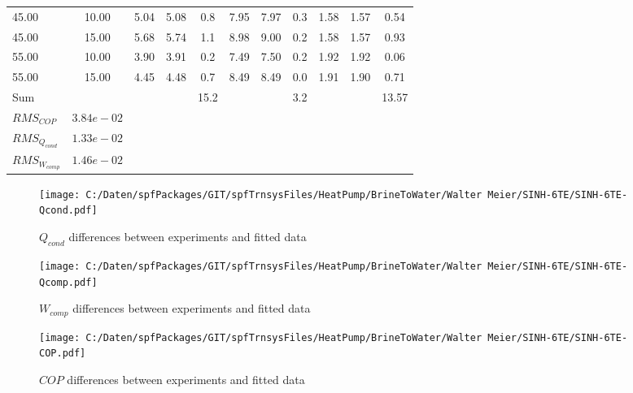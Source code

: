\documentclass[english]{SPFShortReport}
\begin{document}
\begin{table}[!ht]
\begin{small}
\begin{center}
{\begin{tabular}{l | c c c c c c c c c c }
45.00  & 10.00 & 5.04 & 5.08 & 0.8 & 7.95 & 7.97 & 0.3 & 1.58 & 1.57 & 0.54\\ 
45.00  & 15.00 & 5.68 & 5.74 & 1.1 & 8.98 & 9.00 & 0.2 & 1.58 & 1.57 & 0.93\\ 
55.00  & 10.00 & 3.90 & 3.91 & 0.2 & 7.49 & 7.50 & 0.2 & 1.92 & 1.92 & 0.06\\ 
55.00  & 15.00 & 4.45 & 4.48 & 0.7 & 8.49 & 8.49 & 0.0 & 1.91 & 1.90 & 0.71\\ 
\hline 
 Sum &  & &  & 15.2 &  &  & 3.2 & &  & 13.57\\ 
\hline 
 $RMS_{COP}$ & $3.84e-02$ \\ 
 $RMS_{Q_{cond}}$ & $1.33e-02$ \\ 
 $RMS_{W_{comp}}$ & $1.46e-02$ \\ 
\hline
\hline
\end{tabular}
}
\label{ErrorsTable}
\end{center}
\end{small}
\end{table}
\begin{figure}[!ht]
\begin{center}
\texttt{[image: C:/Daten/spfPackages/GIT/spfTrnsysFiles/HeatPump/BrineToWater/Walter Meier/SINH-6TE/SINH-6TE-Qcond.pdf]}
\caption{$Q_{cond}$ differences between experiments and fitted data}
\label{QcongFig}
\end{center}
\end{figure}
\begin{figure}[!ht]
\begin{center}
\texttt{[image: C:/Daten/spfPackages/GIT/spfTrnsysFiles/HeatPump/BrineToWater/Walter Meier/SINH-6TE/SINH-6TE-Qcomp.pdf]}
\caption{$W_{comp}$ differences between experiments and fitted data}
\label{QcompFig}
\end{center}
\end{figure}
\begin{figure}[!ht]
\begin{center}
\texttt{[image: C:/Daten/spfPackages/GIT/spfTrnsysFiles/HeatPump/BrineToWater/Walter Meier/SINH-6TE/SINH-6TE-COP.pdf]}
\caption{$COP$ differences between experiments and fitted data}
\label{COPFig}
\end{center}
\end{figure}
\end{document}
